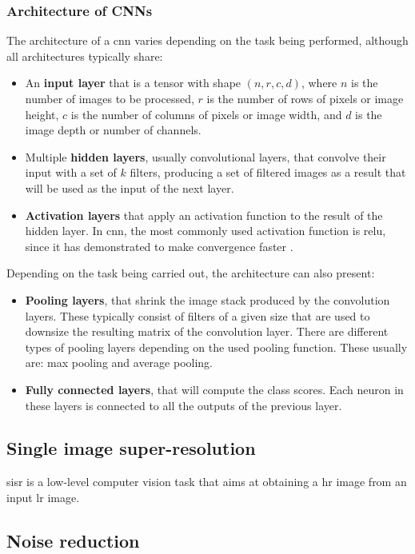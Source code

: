 \subsubsection*{Architecture of CNNs}
The architecture of a \gls{cnn} varies depending on the task being performed, although all architectures typically share:
\begin{itemize}
	\item An \textbf{input layer} that is a tensor with shape 
	$(n, r, c, d)$, where $n$ is the number of images to be processed, $r$ is the number of rows of pixels or image height, $c$ is the number of columns of pixels or image width, and $d$ is the image depth or number of channels.
	\item Multiple \textbf{hidden layers}, usually convolutional layers, that convolve their input with a set of $k$ filters, producing a set of filtered images as a result that will be used as the input of the next layer.
	\item \textbf{Activation layers} that apply an activation function to the result of the hidden layer. In \gls{cnn}, the most commonly used activation function is \gls{relu}, since it has demonstrated to make convergence faster \cite{RELU}.
\end{itemize}

Depending on the task being carried out, the architecture can also present:
\begin{itemize}
	\item \textbf{Pooling layers}, that shrink the image stack produced by the convolution layers. These typically consist of filters of a given size that are used to downsize the resulting matrix of the convolution layer. There are different types of pooling layers depending on the used pooling function. These usually are: max pooling and average pooling.
	\item \textbf{Fully connected layers}, that will compute the class scores. Each neuron in these layers is connected to all the outputs of the previous layer.
\end{itemize}

\subsection{Single image super-resolution}
\gls{sisr} is a low-level computer vision task that aims at obtaining a \gls{hr} image from an input \gls{lr} image. 

\subsection{Noise reduction}